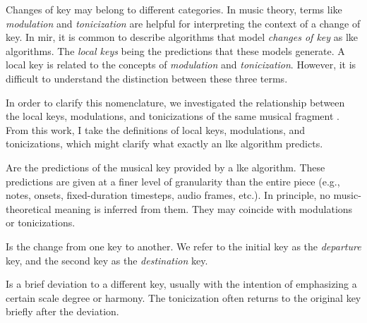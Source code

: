 

Changes of key may belong to different categories. In music
theory, terms like \emph{modulation} and \emph{tonicization}
are helpful for interpreting the context of a change of key.
In \gls{mir}, it is common to describe algorithms that model
\emph{changes of key} as \gls{lke} algorithms. The
\emph{local keys} being the predictions that these models
generate. A local key is related to the concepts of
\emph{modulation} and \emph{tonicization}. However, it is
difficult to understand the distinction between these three
terms.

In order to clarify this nomenclature, we investigated the
relationship between the local keys, modulations, and
tonicizations of the same musical fragment
\parencite{napoleslopez2020local}. From this work, I take
the definitions of local keys, modulations, and
tonicizations, which might clarify what exactly an \gls{lke}
algorithm predicts.

Are the predictions of the musical key provided by a
\gls{lke} algorithm. These predictions are given at a finer
level of granularity than the entire piece (e.g., notes,
onsets, fixed-duration timesteps, audio frames, etc.). In
principle, no music-theoretical meaning is inferred from
them. They may coincide with modulations or tonicizations.

Is the change from one key to another. We refer to the
initial key as the \emph{departure} key, and the second key
as the \emph{destination} key.

Is a brief deviation to a different key, usually with the
intention of emphasizing a certain scale degree or harmony.
The tonicization often returns to the original key briefly
after the deviation.
